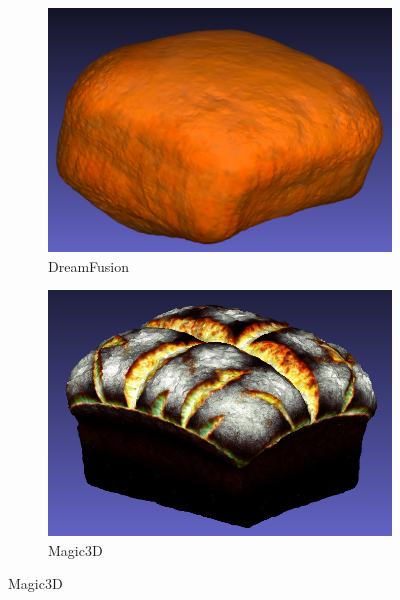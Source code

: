 \begin{figure}[ht]
    \centering
    \small
    \begin{subfigure}[b]{0.31\textwidth}
        \centering
        \includegraphics[width=\textwidth]{etc/a rendering of a highly symmetrical loaf of bread/dreamfusion/dreamfusion_bread_result.png}
        \caption{DreamFusion}
        \vspace{0.1cm}
    \end{subfigure}
    \begin{subfigure}[b]{0.31\textwidth}
        \centering
        \includegraphics[width=\textwidth]{etc/a rendering of a highly symmetrical loaf of bread/magic3d/magic3D_bread_result.png}
        \caption{Magic3D}
        \vspace{0.1cm}
    \end{subfigure}

\end{figure}
